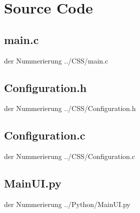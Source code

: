 \chapter{Source Code}
\label{appendixSoureCode}

\newpage
\section{main.c}
%
 der Nummerierung 
		{../CSS/main.c} %

\newpage
\section{Configuration.h}
%
 der Nummerierung 
		{../CSS/Configuration.h} %

\newpage
\section{Configuration.c}
%
 der Nummerierung 
		{../CSS/Configuration.c} %

\newpage
\section{MainUI.py}
%
 der Nummerierung 
		{../Python/MainUI.py} %
